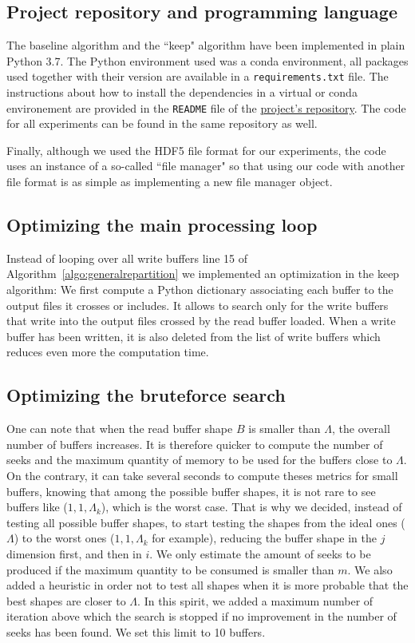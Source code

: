 \documentclass[conference]{IEEEtran}
\begin{document}
\subsection{Project repository and programming language}
The baseline algorithm and the ``keep" algorithm have been implemented in plain
Python 3.7.
The Python environment used was a conda environment, all packages used together
with their version are available in a \texttt{requirements.txt} file.
The instructions about how to install the dependencies in a virtual or conda
environement are provided in the \texttt{README} file of the
\href{https://github.com/GTimothee/repartition_experiments}{project's repository}.
The code for all experiments can be found in the same repository as well.

Finally, although we used the HDF5 file format for our experiments, the code
uses an instance of a so-called ``file manager" so that using our code with
another file format is as simple as implementing a new file manager object.

\subsection{Optimizing the main processing loop}
Instead of looping over all write buffers line 15 of
Algorithm~\ref{algo:generalrepartition} we implemented an optimization in
the keep algorithm:
We first compute a Python dictionary associating each buffer to the output files
it crosses or includes.
It allows to search only for the write buffers that write into the output files
crossed by the read buffer loaded. When a write buffer has been written, it
is also deleted from the list of write buffers which reduces even more the
computation time.

\subsection{Optimizing the bruteforce search}
One can note that when the read buffer shape $B$ is smaller than $\Lambda$,
the overall number of buffers increases.
It is therefore quicker to compute the number of seeks and the maximum
quantity of memory to be used for the buffers close to $\Lambda$.
On the contrary, it can take several seconds to compute theses metrics for
small buffers, knowing that among the possible buffer shapes, it is not rare to
see buffers like ($1,1,\Lambda_k$), which is the worst case.
That is why we decided, instead of testing all possible buffer shapes, to start
testing the shapes from the ideal ones ($\Lambda$) to the worst ones
($1,1,\Lambda_k$ for example), reducing the buffer shape in the $j$ dimension
first, and then in $i$.
We only estimate the amount of seeks to be produced if the maximum quantity
to be consumed is smaller than $m$.
We also added a heuristic in order not to test all shapes when it is more
probable that the best shapes are closer to $\Lambda$.
In this spirit, we added a maximum number of iteration above which the search
is stopped if no improvement in the number of seeks has been found.
We set this limit to 10 buffers.
\end{document}
